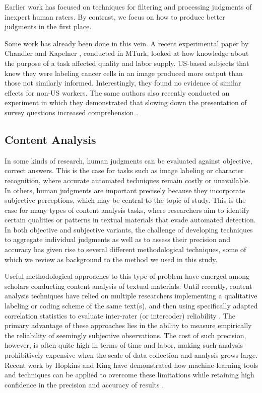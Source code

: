 \documentclass{chi2009}
\begin{document}
Earlier work \cite{von2004labeling, ipeirotis2010, snow2008cheap,
  Hopkins-King2010, downs2010your} has focused on techniques for filtering and
processing judgments of inexpert human raters. By contrast, we focus
on how to produce better judgments in the first place.

Some work has already been done in this vein. A recent experimental
paper by Chandler and Kapelner \cite{chandler2010}, conducted in
MTurk, looked at how knowledge about the purpose of a task affected
quality and labor supply. US-based subjects that knew they were
labeling cancer cells in an image produced more output than those not
similarly informed.  Interestingly, they found no evidence of similar
effects for non-US workers. The same authors also recently conducted
an experiment in which they demonstrated that slowing down the presentation of 
survey questions increased comprehension \cite{kapelnerpreventing}. 
\subsection{Content Analysis}
In some kinds of research, human judgments can be evaluated against
objective, correct answers. This is the case for tasks such as image
labeling or character recognition, where accurate automated techniques
remain costly or unavailable. In others, human judgments are important
precisely because they incorporate subjective perceptions, which may
be central to the topic of study. This is the case for many types of
content analysis tasks, where researchers aim to identify certain
qualities or patterns in textual materials that evade automated
detection. In both objective and subjective variants, the challenge of
developing techniques to aggregate individual judgments as well as to
assess their precision and accuracy has given rise to several
different methodological techniques, some of which we review as
background to the method we used in this study.

Useful methodological approaches to this type of problem have emerged
among scholars conducting content analysis of textual materials. Until
recently, content analysis techniques have relied on multiple
researchers implementing a qualitative labeling or coding scheme of
the same text(s), and then using specifically adapted correlation
statistics to evaluate inter-rater (or intercoder) reliability
\cite{krippendorff_content_2003, cohen_coefficient_1960}. The primary
advantage of these approaches lies in the ability to measure
empirically the reliability of seemingly subjective observations. The
cost of such precision, however, is often quite high in terms of time
and labor, making such analysis prohibitively expensive when the scale
of data collection and analysis grows large. Recent work by Hopkins
and King have demonstrated how machine-learning tools and techniques
can be applied to overcome these limitations while retaining high
confidence in the precision and accuracy of results
\cite{Hopkins-King2010}.
\end{document}
